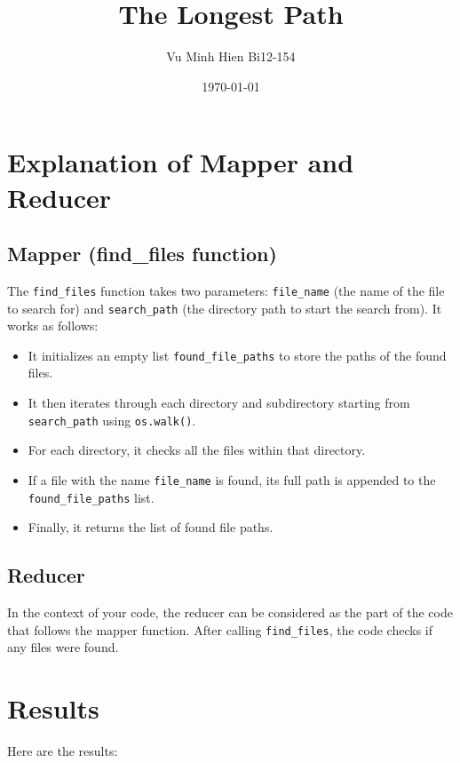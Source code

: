 \documentclass{article}
\begin{document}
\title{The Longest Path}
\author{Vu Minh Hien Bi12-154}
\date{\today}

\maketitle

\section{Explanation of Mapper and Reducer}

\subsection{Mapper (find\_files function)}
The \texttt{find\_files} function takes two parameters: \texttt{file\_name} (the name of the file to search for) and \texttt{search\_path} (the directory path to start the search from). It works as follows:
\begin{itemize}
    \item It initializes an empty list \texttt{found\_file\_paths} to store the paths of the found files.
    \item It then iterates through each directory and subdirectory starting from \texttt{search\_path} using \texttt{os.walk()}.
    \item For each directory, it checks all the files within that directory.
    \item If a file with the name \texttt{file\_name} is found, its full path is appended to the \texttt{found\_file\_paths} list.
    \item Finally, it returns the list of found file paths.
\end{itemize}

\subsection{Reducer}
In the context of your code, the reducer can be considered as the part of the code that follows the mapper function. After calling \texttt{find\_files}, the code checks if any files were found.

\section{Results}

Here are the results:
\end{document}
